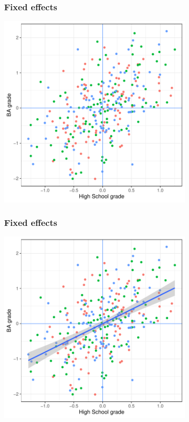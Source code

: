 \documentclass[aspectratio=43]{beamer}
\begin{document}
\begin{frame}
\frametitle{Fixed effects}
\centering

\includegraphics[width = 0.7\textwidth]{../img/fe8}

\end{frame}

\begin{frame}
\frametitle{Fixed effects}
\centering

\includegraphics[width = 0.7\textwidth]{../img/fe9}

\end{frame}
\end{document}
